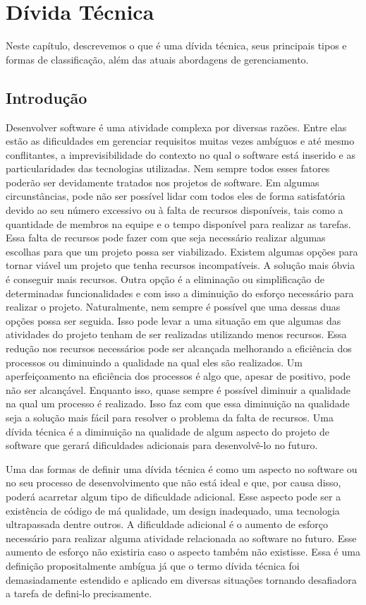 \chapter{Dívida Técnica}
\label{cap:cap2}

Neste capítulo, descrevemos o que é uma dívida técnica, seus principais tipos e formas de classificação, além das atuais abordagens de gerenciamento.


\section{Introdução}


Desenvolver software é uma atividade complexa por diversas razões. Entre elas estão as dificuldades em gerenciar requisitos muitas vezes ambíguos e até mesmo conflitantes, a imprevisibilidade do contexto no qual o software está inserido e as particularidades das tecnologias utilizadas. Nem sempre todos esses fatores poderão ser devidamente tratados nos projetos de software. Em algumas circunstâncias, pode não ser possível lidar com todos eles de forma satisfatória devido ao seu número excessivo ou à falta de recursos disponíveis, tais como a quantidade de membros na equipe e o tempo disponível para realizar as tarefas. Essa falta de recursos pode fazer com que seja necessário realizar algumas escolhas para que um projeto possa ser viabilizado. Existem algumas opções para tornar viável um projeto que tenha recursos incompatíveis.  A solução mais óbvia é conseguir mais recursos. Outra opção é a eliminação ou simplificação  de determinadas funcionalidades e com isso a diminuição do esforço necessário para realizar o projeto.   Naturalmente, nem sempre é possível que uma dessas duas opções possa ser seguida. Isso pode levar a uma situação em que algumas das atividades do projeto tenham de ser realizadas utilizando menos recursos. Essa redução nos recursos necessários pode ser alcançada melhorando a eficiência dos processos ou diminuindo a qualidade na qual eles são realizados. Um aperfeiçoamento na eficiência dos processos é algo que, apesar de positivo, pode não ser alcançável. Enquanto isso, quase sempre é possível diminuir a qualidade na qual um processo é realizado. Isso faz com que essa diminuição na qualidade seja a solução mais fácil para resolver o problema da falta de recursos. Uma dívida técnica é a diminuição na qualidade de algum aspecto do projeto de software que gerará dificuldades adicionais para  desenvolvê-lo no futuro.

Uma das formas de definir uma dívida técnica é como um aspecto no software ou no seu processo de desenvolvimento que não está ideal e que, por causa disso, poderá acarretar algum tipo de dificuldade adicional. Esse aspecto pode ser a existência de código de má qualidade, um design inadequado, uma tecnologia ultrapassada dentre outros. A dificuldade adicional é o aumento de esforço necessário para realizar alguma atividade relacionada ao software no futuro.  Esse aumento de esforço não existiria caso o aspecto também não existisse. Essa é uma definição propositalmente ambígua já que o termo dívida técnica foi demasiadamente estendido e aplicado em diversas situações tornando desafiadora a tarefa de defini-lo precisamente. 



